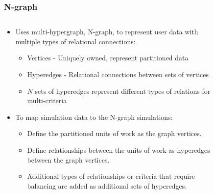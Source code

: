 \documentclass[aspectratio=169]{beamer}
\begin{document}
\begin{frame}
  \frametitle{N-graph}
  \begin{columns}
    \begin{column}{.75\textwidth}
      \begin{itemize}
      \item Uses multi-hypergraph, N-graph, to represent user data with multiple types of relational connections:
        \begin{itemize}
        \item Vertices - Uniquely owned, represent partitioned data
        \item Hyperedges - Relational connections between sets of vertices
        \item $N$ sets of hyperedges represent different types of relations for multi-criteria
        \end{itemize}
      \item To map simulation data to the N-graph simulations:
        \begin{itemize}
        \item Define the partitioned units of work as the graph vertices.
        \item Define relationships between the units of work as hyperedges between the graph vertices.
        \item Additional types of relationships or criteria that require balancing are added as additional sets of hyperedges.
        \end{itemize}
      \end{itemize}
        \end{column}
    \begin{column}{.25\textwidth}
      \begin{figure}

\end{figure}
\end{column}
\end{columns}
\end{frame}
\end{document}
